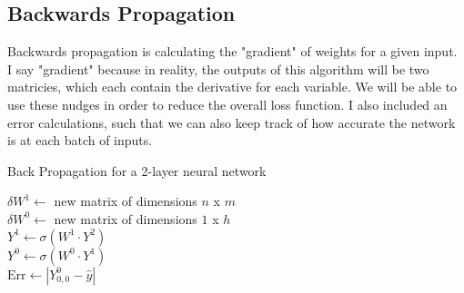 \documentclass[10pt]{article}
\begin{document}
\subsection{Backwards Propagation}
Backwards propagation is calculating the "gradient" of weights for a given input. I say "gradient" because in reality, the outputs of this algorithm will be two matricies, which each contain the derivative for each variable. We will be able to use these nudges in order to reduce the overall loss function. I also included an error calculations, such that we can also keep track of how accurate the network is at each batch of inputs.\newline
\begin{algorithm}[H]
    \caption{Back Propagation for a 2-layer neural network}
    $\delta W^1 \gets$ new matrix of dimensions $n$ x $m$\\
    $\delta W^0 \gets$ new matrix of dimensions $1$ x $h$\\
    $Y^1 \gets \sigma(W^1 \cdot Y^2)$\\
    $Y^0 \gets \sigma(W^0 \cdot Y^1)$\\
    $\text{Err} \gets | Y^0_{0,0} - \hat{y} |$\\
\end{algorithm}
\end{document}
